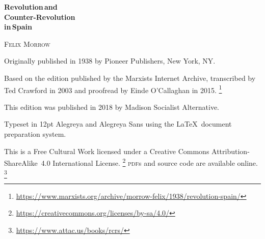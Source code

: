 \begin{titlepage}
	\setlength{\parindent}{0pt}
	
	\vspace*{\fill}
	
	{\sffamily\bfseries\fontsize{40}{40}\selectfont
		Revolution\,\textmd{and} \\
		Counter-Revolution \\
		\textmd{in}\,Spain
		\par}
	
	\vspace{60pt}
	
	{\fontsize{20}{20}\selectfont
		\textsc{Felix Morrow}
		\par}
	
	\vspace*{\fill}
	
\end{titlepage}

{
	\thispagestyle{empty}
	\setlength{\parindent}{0em}
	\setlength{\parskip}{0.5em}
	\sloppy
	\raggedright
	
	\vspace*{\fill}
	\vspace*{\fill}
	
	Originally published in 1938 by Pioneer Publishers, New York, NY.
	
	Based on the edition published by the Marxists Internet Archive, transcribed by Ted Crawford in 2003 and proofread by Einde O’Cal\-la\-ghan in 2015.%
	\footnote{\href{https://www.marxists.org/archive/morrow-felix/1938/revolution-spain/}{https://www.marxists.org/archive/morrow-felix/1938/revolution-spain/}}
	
	This edition was published in 2018 by Madison Socialist Alternative.
	
	Typeset in 12pt Alegreya and {\AlegreyaSans Alegreya Sans} using the \LaTeX\ document preparation system.
	
	This is a Free Cultural Work licensed under a Creative Commons Attribution-ShareAlike~4.0 International License.%
	\footnote{\href{https://creativecommons.org/licenses/by-sa/4.0/}{https://creativecommons.org/licenses/by-sa/4.0/}}
	\textsc{pdf}s and source code are available online.%
	\footnote{\href{https://www.attac.us/books/rcrs/}{https://www.attac.us/books/rcrs/}}
	
	\vspace*{\fill}
}